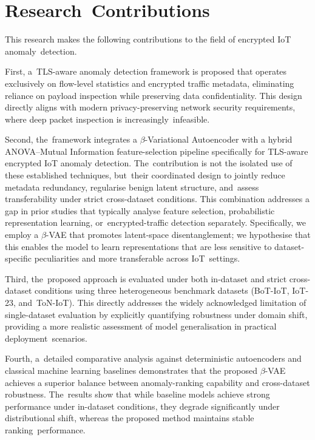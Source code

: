 \documentclass[futureinternet,article,accept,moreauthors]{Definitions/mdpi}
\begin{document}

\section{Research~Contributions} \label{sec2}

This research makes the following contributions to the field of encrypted IoT anomaly~detection.

First, a~TLS-aware anomaly detection framework is proposed that operates exclusively on flow-level statistics and encrypted traffic metadata, eliminating reliance on payload inspection while preserving data confidentiality. This design directly aligns with modern privacy-preserving network security requirements, where deep packet inspection is increasingly~infeasible.

Second, the~framework integrates a $\beta$-Variational Autoencoder with a hybrid ANOVA--Mutual Information feature-selection pipeline specifically for TLS-aware encrypted IoT anomaly detection. The~contribution is not the isolated use of these established techniques, but~their coordinated design to jointly reduce metadata redundancy, regularise benign latent structure, and~assess transferability under strict cross-dataset conditions. This combination addresses a gap in prior studies that typically analyse feature selection, probabilistic representation learning, or~encrypted-traffic detection separately. Specifically, we employ a $\beta$-VAE that promotes latent-space disentanglement; we hypothesise that this enables the model to learn representations that are less sensitive to dataset-specific peculiarities and more transferable across IoT~settings.

Third, the~proposed approach is evaluated under both in-dataset and strict cross-dataset conditions using three heterogeneous benchmark datasets (BoT-IoT, IoT-23, and~ToN-IoT). This directly addresses the widely acknowledged limitation of single-dataset evaluation by explicitly quantifying robustness under domain shift, providing a more realistic assessment of model generalisation in practical deployment~scenarios.

Fourth, a~detailed comparative analysis against deterministic autoencoders and classical machine learning baselines demonstrates that the proposed $\beta$-VAE achieves a superior balance between anomaly-ranking capability and cross-dataset robustness. The~results show that while baseline models achieve strong performance under in-dataset conditions, they degrade significantly under distributional shift, whereas the proposed method maintains stable ranking~performance.
\end{document}
